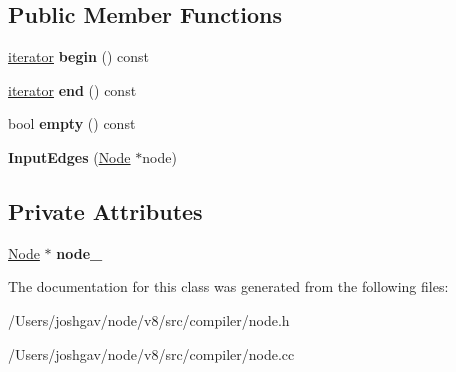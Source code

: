 \subsection*{Public Member Functions}
\begin{DoxyCompactItemize}
\item 
\hyperlink{classv8_1_1internal_1_1compiler_1_1_node_1_1_input_edges_1_1iterator}{iterator} {\bfseries begin} () const \hypertarget{classv8_1_1internal_1_1compiler_1_1_node_1_1_input_edges_a984c1752005f4393bcdf730e43979f8c}{}\label{classv8_1_1internal_1_1compiler_1_1_node_1_1_input_edges_a984c1752005f4393bcdf730e43979f8c}

\item 
\hyperlink{classv8_1_1internal_1_1compiler_1_1_node_1_1_input_edges_1_1iterator}{iterator} {\bfseries end} () const \hypertarget{classv8_1_1internal_1_1compiler_1_1_node_1_1_input_edges_aa7e9126617eda647ae16ec9a2b46a72d}{}\label{classv8_1_1internal_1_1compiler_1_1_node_1_1_input_edges_aa7e9126617eda647ae16ec9a2b46a72d}

\item 
bool {\bfseries empty} () const \hypertarget{classv8_1_1internal_1_1compiler_1_1_node_1_1_input_edges_a012eaa804bf79fe662794d99e269abd9}{}\label{classv8_1_1internal_1_1compiler_1_1_node_1_1_input_edges_a012eaa804bf79fe662794d99e269abd9}

\item 
{\bfseries Input\+Edges} (\hyperlink{classv8_1_1internal_1_1compiler_1_1_node}{Node} $\ast$node)\hypertarget{classv8_1_1internal_1_1compiler_1_1_node_1_1_input_edges_aa0fe33cded3af03ad34dea705ebfb4ef}{}\label{classv8_1_1internal_1_1compiler_1_1_node_1_1_input_edges_aa0fe33cded3af03ad34dea705ebfb4ef}

\end{DoxyCompactItemize}
\subsection*{Private Attributes}
\begin{DoxyCompactItemize}
\item 
\hyperlink{classv8_1_1internal_1_1compiler_1_1_node}{Node} $\ast$ {\bfseries node\+\_\+}\hypertarget{classv8_1_1internal_1_1compiler_1_1_node_1_1_input_edges_a1ea3d10bcbef8a58a20c8a4e78f37e4a}{}\label{classv8_1_1internal_1_1compiler_1_1_node_1_1_input_edges_a1ea3d10bcbef8a58a20c8a4e78f37e4a}

\end{DoxyCompactItemize}


The documentation for this class was generated from the following files\+:\begin{DoxyCompactItemize}
\item 
/\+Users/joshgav/node/v8/src/compiler/node.\+h\item 
/\+Users/joshgav/node/v8/src/compiler/node.\+cc\end{DoxyCompactItemize}
